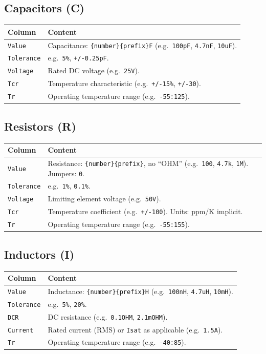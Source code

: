\documentclass[11pt,a4paper]{article}
\begin{document}
\subsection{Capacitors (C)}

\begin{tabular}{@{}lL{9cm}@{}}
\toprule
Column & Content \\
\midrule
\texttt{Value}     & Capacitance: \texttt{\{number\}\{prefix\}F} (e.g.\ \texttt{100pF}, \texttt{4.7nF}, \texttt{10uF}). \\
\texttt{Tolerance} & e.g.\ \texttt{5\%}, \texttt{+/-0.25pF}. \\
\texttt{Voltage}   & Rated DC voltage (e.g.\ \texttt{25V}). \\
\texttt{Tcr}       & Temperature characteristic (e.g.\ \texttt{+/-15\%}, \texttt{+/-30}). \\
\texttt{Tr}        & Operating temperature range (e.g.\ \texttt{-55:125}). \\
\bottomrule
\end{tabular}

\subsection{Resistors (R)}

\begin{tabular}{@{}lL{9cm}@{}}
\toprule
Column & Content \\
\midrule
\texttt{Value}     & Resistance: \texttt{\{number\}\{prefix\}}, no ``OHM'' (e.g.\ \texttt{100}, \texttt{4.7k}, \texttt{1M}). Jumpers: \texttt{0}. \\
\texttt{Tolerance} & e.g.\ \texttt{1\%}, \texttt{0.1\%}. \\
\texttt{Voltage}   & Limiting element voltage (e.g.\ \texttt{50V}). \\
\texttt{Tcr}       & Temperature coefficient (e.g.\ \texttt{+/-100}). Units: ppm/K implicit. \\
\texttt{Tr}        & Operating temperature range (e.g.\ \texttt{-55:155}). \\
\bottomrule
\end{tabular}

\subsection{Inductors (I)}

\begin{tabular}{@{}lL{9cm}@{}}
\toprule
Column & Content \\
\midrule
\texttt{Value}     & Inductance: \texttt{\{number\}\{prefix\}H} (e.g.\ \texttt{100nH}, \texttt{4.7uH}, \texttt{10mH}). \\
\texttt{Tolerance} & e.g.\ \texttt{5\%}, \texttt{20\%}. \\
\texttt{DCR}       & DC resistance (e.g.\ \texttt{0.1OHM}, \texttt{2.1mOHM}). \\
\texttt{Current}   & Rated current (RMS) or \texttt{Isat} as applicable (e.g.\ \texttt{1.5A}). \\
\texttt{Tr}        & Operating temperature range (e.g.\ \texttt{-40:85}). \\
\bottomrule
\end{tabular}
\end{document}
